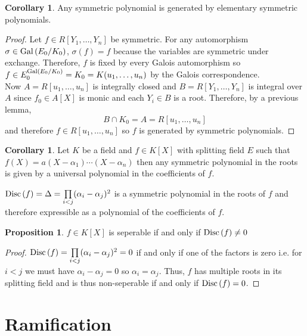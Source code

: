 \documentclass[12pt]{extarticle}
\theoremstyle{definition}
\newtheorem{proposition}[theorem]{Proposition}
\newtheorem{corollary}[theorem]{Corollary}
\newenvironment{definition}[1][Definition:]{\begin{trivlist}
\item[\hskip \labelsep {\bfseries #1}]}{\end{trivlist}}
\begin{document}
\begin{corollary}
Any symmetric polynomial is generated by elementary symmetric polynomials.
\end{corollary}

\begin{proof}
Let $f \in R[Y_1, \dots, Y_n]$ be symmetric. For any automorphism $\sigma \in \mathrm{Gal}\left( E_0/K_0 \right)$, $\sigma(f) = f$ because the variables are symmetric under exchange. Therefore, $f$ is fixed by every Galois automorphism so $f \in E_0^{\mathrm{Gal}\left( E_0/K_0 \right)} = K_0 = K(u_1, \dots, u_n)$ by the Galois correspondence.
\bigskip\\
Now $A = R[u_1, \dots, u_n]$ is integrally closed and $B = R[Y_1, \dots, Y_n]$ is integral over $A$ since $f_0 \in A[X]$ is monic and each $Y_i \in B$ is a root. Therefore, by a previous lemma,
\[ B \cap K_0 = A = R[u_1, \dots, u_n] \]
and therefore $f \in R[u_1, \dots, u_n]$ so $f$ is generated by symmetric polynomials.
\end{proof}

\begin{corollary}
Let $K$ be a field and $f \in K[X]$ with splitting field $E$ such that $f(X) = a(X - \alpha_1) \cdots (X - \alpha_n)$ then any symmetric polynomial in the roots is given by a universal polynomial in the coefficients of $f$.  
\end{corollary}

\begin{definition}
$\mathrm{Disc}\left( f \right) = \Delta = \prod\limits_{i < j} (\alpha_i - \alpha_j)^2$ is a symmetric polynomial in the roots of $f$ and therefore expressible as a polynomial of the coefficients of $f$. 
\end{definition}

\begin{proposition}
$f \in K[X]$ is seperable if and only if $\mathrm{Disc}\left( f \right) \neq 0$
\end{proposition}

\begin{proof}
$\mathrm{Disc}\left( f \right) = \prod\limits_{i < j} (\alpha_i - \alpha_j)^2 = 0$ if and only if one of the factors is zero i.e. for $i < j$ we must have $\alpha_i - \alpha_j = 0$ so $\alpha_i = \alpha_j$. Thus, $f$ has multiple roots in its splitting field and is thus non-seperable if and only if $\mathrm{Disc}\left( f \right) = 0$. 
\end{proof}




\section{Ramification}
\end{document}
